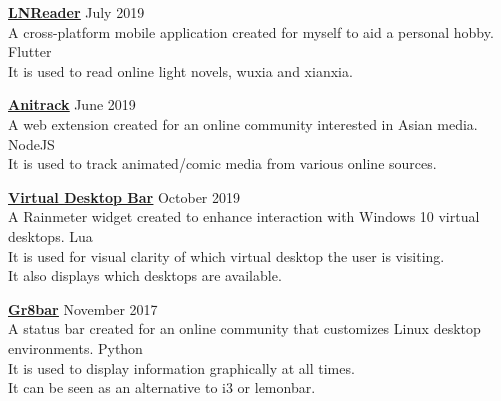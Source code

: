 \documentclass[a4paper]{article}
\begin{document}
{\textbf{\href{https://sedlar.me/lnreader}{\ul{LNReader}}}} \hfill July 2019 \\
\vspace*{1mm}
A cross-platform mobile application created for myself to aid a personal hobby. \hfill Flutter \\
It is used to read online light novels, wuxia and xianxia.
\vspace*{1mm}

{\textbf{\href{https://github.com/TSedlar/anitrack}{\ul{Anitrack}}}} \hfill June 2019 \\
\vspace*{1mm}
A web extension created for an online community interested in Asian media. \hfill NodeJS \\
It is used to track animated/comic media from various online sources.
\vspace*{1mm}

{\textbf{\href{https://github.com/TSedlar/VirtualDesktopBar}{\ul{Virtual Desktop Bar}}}} \hfill October 2019 \\
\vspace*{1mm}
A Rainmeter widget created to enhance interaction with Windows 10 virtual desktops. \hfill Lua \\
It is used for visual clarity of which virtual desktop the user is visiting. \\
It also displays which desktops are available.
\vspace*{1mm}

{\textbf{\href{https://github.com/TSedlar/gr8bar}{\ul{Gr8bar}}}} \hfill November 2017 \\
\vspace*{1mm}
A status bar created for an online community that customizes Linux desktop environments. \hfill Python \\
It is used to display information graphically at all times. \\
It can be seen as an alternative to i3 or lemonbar.
\vspace*{1mm}

\vspace*{2mm}
\end{document}
